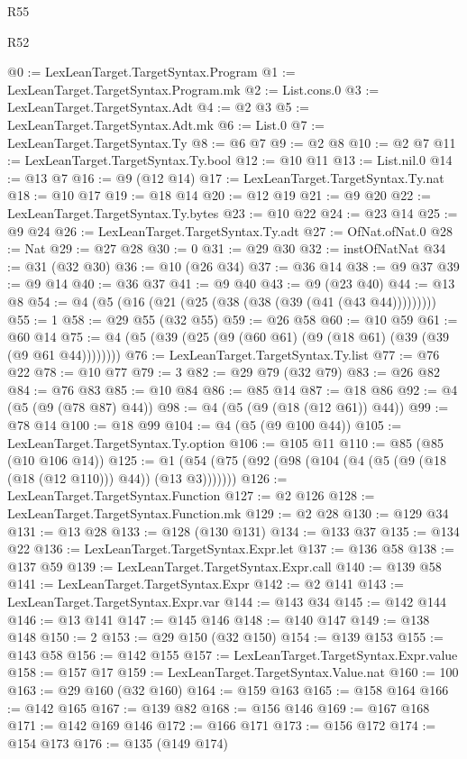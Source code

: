\begin{lexlean}{R55}
\begin{lexlean}{R52}
\begin{coremodule}
{{{{{{{{{{{{{{{{{{{{{{{{{{{{{{{{{{{{{{{{{{{{{{{{{{{{{{{{{{{{{{{{{{{{{{{{{{{{{{{{{{{{{{{{{{{{{{{{{{{{{{{{{{{{{{{{{{{{{{{{{{{{{{{{{{{{{{{{{{{{{{{{{{{{{{{{{{{{{{{{{{{{{{{{{{{{{{{{{{{{{{{{{{{{{{{{{{{{{{@0 := LexLeanTarget.TargetSyntax.Program
@1 := LexLeanTarget.TargetSyntax.Program.mk
@2 := List.cons.{0}
@3 := LexLeanTarget.TargetSyntax.Adt
@4 := @2 @3
@5 := LexLeanTarget.TargetSyntax.Adt.mk
@6 := List.{0}
@7 := LexLeanTarget.TargetSyntax.Ty
@8 := @6 @7
@9 := @2 @8
@10 := @2 @7
@11 := LexLeanTarget.TargetSyntax.Ty.bool
@12 := @10 @11
@13 := List.nil.{0}
@14 := @13 @7
@16 := @9 (@12 @14)
@17 := LexLeanTarget.TargetSyntax.Ty.nat
@18 := @10 @17
@19 := @18 @14
@20 := @12 @19
@21 := @9 @20
@22 := LexLeanTarget.TargetSyntax.Ty.bytes
@23 := @10 @22
@24 := @23 @14
@25 := @9 @24
@26 := LexLeanTarget.TargetSyntax.Ty.adt
@27 := OfNat.ofNat.{0}
@28 := Nat
@29 := @27 @28
@30 := 0
@31 := @29 @30
@32 := instOfNatNat
@34 := @31 (@32 @30)
@36 := @10 (@26 @34)
@37 := @36 @14
@38 := @9 @37
@39 := @9 @14
@40 := @36 @37
@41 := @9 @40
@43 := @9 (@23 @40)
@44 := @13 @8
@54 := @4 (@5 (@16 (@21 (@25 (@38 (@38 (@39 (@41 (@43 @44)))))))))
@55 := 1
@58 := @29 @55 (@32 @55)
@59 := @26 @58
@60 := @10 @59
@61 := @60 @14
@75 := @4 (@5 (@39 (@25 (@9 (@60 @61) (@9 (@18 @61) (@39 (@39 (@9 @61 @44))))))))
@76 := LexLeanTarget.TargetSyntax.Ty.list
@77 := @76 @22
@78 := @10 @77
@79 := 3
@82 := @29 @79 (@32 @79)
@83 := @26 @82
@84 := @76 @83
@85 := @10 @84
@86 := @85 @14
@87 := @18 @86
@92 := @4 (@5 (@9 (@78 @87) @44))
@98 := @4 (@5 (@9 (@18 (@12 @61)) @44))
@99 := @78 @14
@100 := @18 @99
@104 := @4 (@5 (@9 @100 @44))
@105 := LexLeanTarget.TargetSyntax.Ty.option
@106 := @105 @11
@110 := @85 (@85 (@10 @106 @14))
@125 := @1 (@54 (@75 (@92 (@98 (@104 (@4 (@5 (@9 (@18 (@18 (@12 @110))) @44)) (@13 @3)))))))
@126 := LexLeanTarget.TargetSyntax.Function
@127 := @2 @126
@128 := LexLeanTarget.TargetSyntax.Function.mk
@129 := @2 @28
@130 := @129 @34
@131 := @13 @28
@133 := @128 (@130 @131)
@134 := @133 @37
@135 := @134 @22
@136 := LexLeanTarget.TargetSyntax.Expr.let
@137 := @136 @58
@138 := @137 @59
@139 := LexLeanTarget.TargetSyntax.Expr.call
@140 := @139 @58
@141 := LexLeanTarget.TargetSyntax.Expr
@142 := @2 @141
@143 := LexLeanTarget.TargetSyntax.Expr.var
@144 := @143 @34
@145 := @142 @144
@146 := @13 @141
@147 := @145 @146
@148 := @140 @147
@149 := @138 @148
@150 := 2
@153 := @29 @150 (@32 @150)
@154 := @139 @153
@155 := @143 @58
@156 := @142 @155
@157 := LexLeanTarget.TargetSyntax.Expr.value
@158 := @157 @17
@159 := LexLeanTarget.TargetSyntax.Value.nat
@160 := 100
@163 := @29 @160 (@32 @160)
@164 := @159 @163
@165 := @158 @164
@166 := @142 @165
@167 := @139 @82
@168 := @156 @146
@169 := @167 @168
@171 := @142 @169 @146
@172 := @166 @171
@173 := @156 @172
@174 := @154 @173
@176 := @135 (@149 @174)
}}}}}}}}}}}}}}}}}}}}}}}}}}}}}}}}}}}}}}}}}}}}}}}}}}}}}}}}}}}}}}}}}}}}}}}}}}}}}}}}}}}}}}}}}}}}}}}}}}}}}}}}}}}}}}}}}}}}}}}}}}}}}}}}}}}}}}}}}}}}}}}}}}}}}}}}}}}}}}}}}}}}}}}}}}}}}}}}}}}}}}}}}}}}}}}}}}}}}}
\end{coremodule}
\end{lexlean}
\end{lexlean}
